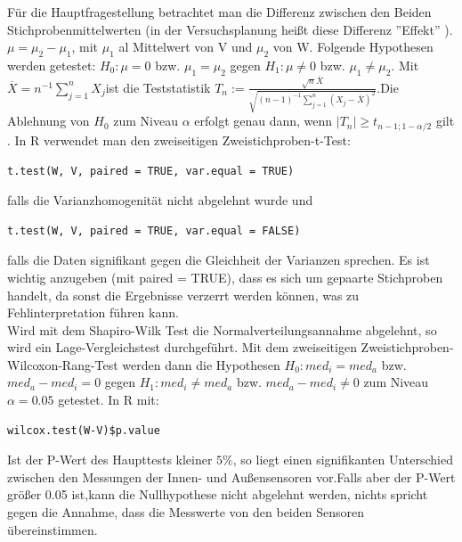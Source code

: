 \documentclass[ ngerman, fontsize= 12pt, paper=a4, headings=big, titlepage=true]{article}
\begin{document}
Für die Hauptfragestellung betrachtet man die Differenz zwischen den Beiden Stichprobenmittelwerten (in der Versuchsplanung heißt diese Differenz ''Effekt'' \cite{1}).
$\mu = \mu_2 - \mu_1 $, mit $ \mu_1 $ al Mittelwert von V und $ \mu_2 $ von W. Folgende Hypothesen werden getestet:
$ H_0: \mu = 0 $ bzw. $ \mu_1 = \mu_2 $ gegen $ H_1: \mu \neq 0 $ bzw. $ \mu_1 \neq \mu_2 $. Mit $ \overline{X}= n^{-1}\sum^n_{j=1}X_j $ist die Teststatistik 
$ T_n := \frac{\sqrt{n}\overline{X}}{\sqrt{(n-1)^{-1}\sum^n_{j = 1} (X_j - \overline{X}) ^2}} $.Die Ablehnung von $H_0 $ zum Niveau $\alpha $ erfolgt genau dann, wenn $ |T_n| \geq t_{n-1;1-\alpha/2} $ gilt \cite{2}. In R verwendet man den zweiseitigen Zweistichproben-t-Test: 
\begin{lstlisting}
t.test(W, V, paired = TRUE, var.equal = TRUE)
\end{lstlisting}
falls die Varianzhomogenität nicht abgelehnt wurde und 
\begin{lstlisting}
t.test(W, V, paired = TRUE, var.equal = FALSE)
\end{lstlisting} falls die Daten signifikant gegen die Gleichheit der Varianzen sprechen. Es ist wichtig anzugeben (mit paired = TRUE), dass es sich um gepaarte Stichproben handelt, da sonst die Ergebnisse verzerrt werden können, was zu Fehlinterpretation führen kann.\\
Wird mit dem Shapiro-Wilk Test die Normalverteilungsannahme abgelehnt, so wird ein Lage-Vergleichstest durchgeführt. Mit dem zweiseitigen Zweistichproben-Wilcoxon-Rang-Test werden dann die Hypothesen $ H_0: med_i = med_a $ bzw. $ med_a - med_i = 0 $ gegen $H_1: med_i \neq med_a $ bzw. $ med_a - med_i \neq 0 $ zum Niveau $\alpha = 0.05 $ getestet. In R mit: \begin{lstlisting}
wilcox.test(W-V)$p.value
\end{lstlisting}
Ist der P-Wert des Haupttests kleiner $5\% $, so liegt einen signifikanten Unterschied zwischen den Messungen der Innen- und Außensensoren vor.Falls aber der P-Wert größer 0.05 ist,kann die Nullhypothese nicht abgelehnt werden, nichts spricht gegen die Annahme, dass die Messwerte von den beiden Sensoren übereinstimmen. \\
\end{document}
